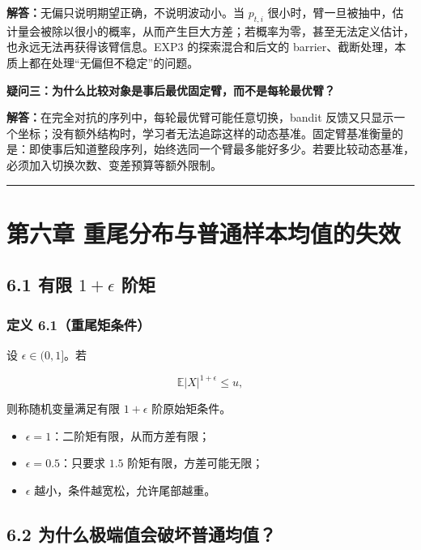 \documentclass[
  11pt,
  a4paper,
]{ctexart}
\providecommand{\tightlist}{%
  \setlength{\itemsep}{0pt}\setlength{\parskip}{0pt}}
\begin{document}
\textbf{解答：}无偏只说明期望正确，不说明波动小。当 \(p_{t,i}\) 很小时，臂一旦被抽中，估计量会被除以很小的概率，从而产生巨大方差；若概率为零，甚至无法定义估计，也永远无法再获得该臂信息。EXP3 的探索混合和后文的 barrier、截断处理，本质上都在处理“无偏但不稳定”的问题。

\textbf{疑问三：为什么比较对象是事后最优固定臂，而不是每轮最优臂？}

\textbf{解答：}在完全对抗的序列中，每轮最优臂可能任意切换，bandit 反馈又只显示一个坐标；没有额外结构时，学习者无法追踪这样的动态基准。固定臂基准衡量的是：即使事后知道整段序列，始终选同一个臂最多能好多少。若要比较动态基准，必须加入切换次数、变差预算等额外限制。

\begin{center}\rule{0.5\linewidth}{0.5pt}\end{center}

\section{第六章
重尾分布与普通样本均值的失效}\label{ux7b2cux516dux7ae0-ux91cdux5c3eux5206ux5e03ux4e0eux666eux901aux6837ux672cux5747ux503cux7684ux5931ux6548}

\subsection{\texorpdfstring{6.1 有限 \(1+\epsilon\)
阶矩}{6.1 有限 1+\textbackslash epsilon 阶矩}}\label{ux6709ux9650-1epsilon-ux9636ux77e9}

\subsubsection{定义
6.1（重尾矩条件）}\label{ux5b9aux4e49-6.1ux91cdux5c3eux77e9ux6761ux4ef6}

设 \(\epsilon\in(0,1]\)。若

\[
\mathbb E|X|^{1+\epsilon}\le u,
\]

则称随机变量满足有限 \(1+\epsilon\) 阶原始矩条件。

\begin{itemize}
\tightlist
\item
  \(\epsilon=1\)：二阶矩有限，从而方差有限；
\item
  \(\epsilon=0.5\)：只要求 \(1.5\) 阶矩有限，方差可能无限；
\item
  \(\epsilon\) 越小，条件越宽松，允许尾部越重。
\end{itemize}

\subsection{6.2
为什么极端值会破坏普通均值？}\label{ux4e3aux4ec0ux4e48ux6781ux7aefux503cux4f1aux7834ux574fux666eux901aux5747ux503c}
\end{document}
